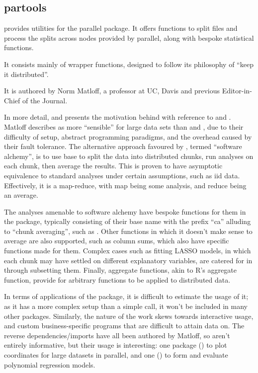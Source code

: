 \subsection{partools}\label{subsec:partools}

 provides utilities for the parallel
package\cite{matloff16softw_alchemy}.
It offers functions to split files and process the splits across nodes provided by parallel, along with bespoke statistical functions.

It consists mainly of wrapper functions, designed to follow its philosophy of ``keep it distributed''.

It is authored by Norm Matloff, a professor at UC, Davis and previous Editor-in-Chief of the \R{} Journal.

In more detail, \textcite{matloff15} and \textcite{matloff17} presents the motivation behind  with reference to  and .
Matloff describes  as more ``sensible'' for large data sets than  and , due to their difficulty of setup, abstract programming paradigms, and the overhead caused by their fault tolerance.
The alternative approach favoured by , termed ``software alchemy'', is to use base \R{} to split the data into distributed chunks, run analyses on each chunk, then average the results.
This is proven to have asymptotic equivalence to standard analyses under certain assumptions, such as iid data.
Effectively, it is a map-reduce, with map being some analysis, and reduce being an average.

The analyses amenable to software alchemy have bespoke functions for them in the package, typically consisting of their base \R{} name with the prefix ``ca'' alluding to ``chunk averaging'', such as .
Other functions in which it doesn't make sense to average are also supported, such as column sums, which also have specific functions made for them.
Complex cases such as fitting LASSO models, in which each chunk may have settled on different explanatory variables, are catered for in  through subsetting them.
Finally, aggregate functions, akin to R's aggregate function, provide for arbitrary functions to be applied to distributed data.

In terms of applications of the package, it is difficult to estimate the usage of it; as it has a more complex setup than a simple  call, it won't be included in many other packages.
Similarly, the nature of the work skews towards interactive usage, and custom business-specific programs that are difficult to attain data on.
The reverse dependencies/imports have all been authored by Matloff, so aren't entirely informative, but their usage is interesting: one package () to plot coordinates for large datasets in parallel, and one () to form and evaluate polynomial regression models.

